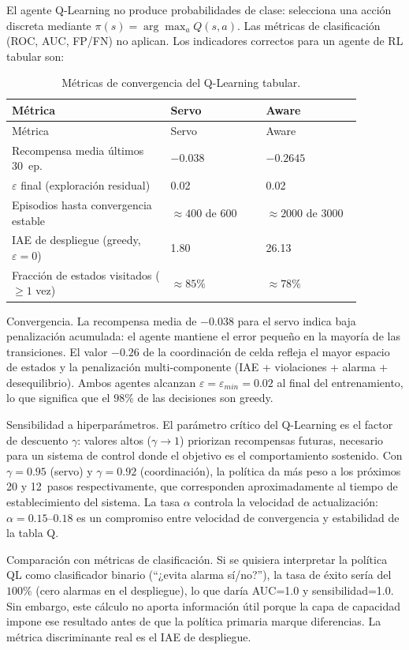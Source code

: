 El agente Q-Learning no produce probabilidades de clase: selecciona una acción discreta mediante $\pi(s)=\arg\max_a Q(s,a)$. Las métricas de clasificación (ROC, AUC, FP/FN) no aplican. Los indicadores correctos para un agente de RL tabular son:

\begin{longtable}{@{}P{0.40\linewidth}P{0.24\linewidth}P{0.24\linewidth}@{}}
\caption{Métricas de convergencia del Q-Learning tabular.}
\label{tab:ql_metrics}\\
\toprule
Métrica & Servo & Aware \\ \midrule \endfirsthead
\toprule Métrica & Servo & Aware \\ \midrule \endhead
Recompensa media últimos 30~ep. & $-0.038$ & $-0.2645$ \\
$\varepsilon$ final (exploración residual) & 0.02 & 0.02 \\
Episodios hasta convergencia estable & $\approx400$ de 600 & $\approx2000$ de 3000 \\
IAE de despliegue (greedy, $\varepsilon=0$) & 1.80 & 26.13 \\
Fracción de estados visitados ($\geq1$ vez) & $\approx85\%$ & $\approx78\%$ \\
\bottomrule
\end{longtable}

Convergencia. La recompensa media de $-0.038$ para el servo indica baja penalización acumulada: el agente mantiene el error pequeño en la mayoría de las transiciones. El valor $-0.26$ de la coordinación de celda refleja el mayor espacio de estados y la penalización multi-componente (IAE + violaciones + alarma + desequilibrio). Ambos agentes alcanzan $\varepsilon=\varepsilon_{min}=0.02$ al final del entrenamiento, lo que significa que el $98\%$ de las decisiones son greedy.

Sensibilidad a hiperparámetros. El parámetro crítico del Q-Learning es el factor de descuento $\gamma$: valores altos ($\gamma\to1$) priorizan recompensas futuras, necesario para un sistema de control donde el objetivo es el comportamiento sostenido. Con $\gamma=0.95$ (servo) y $\gamma=0.92$ (coordinación), la política da más peso a los próximos 20 y 12~pasos respectivamente, que corresponden aproximadamente al tiempo de establecimiento del sistema. La tasa $\alpha$ controla la velocidad de actualización: $\alpha=0.15$--$0.18$ es un compromiso entre velocidad de convergencia y estabilidad de la tabla Q.

Comparación con métricas de clasificación. Si se quisiera interpretar la política QL como clasificador binario (``¿evita alarma sí/no?''), la tasa de éxito sería del $100\%$ (cero alarmas en el despliegue), lo que daría AUC=1.0 y sensibilidad=1.0. Sin embargo, este cálculo no aporta información útil porque la capa de capacidad impone ese resultado antes de que la política primaria marque diferencias. La métrica discriminante real es el IAE de despliegue.
